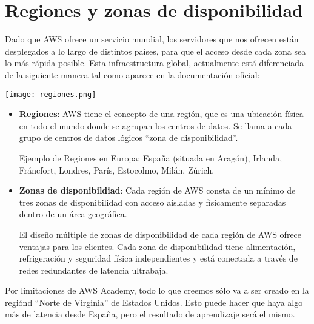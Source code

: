 \chapter{Regiones y zonas de disponibilidad}

Dado que AWS ofrece un servicio mundial, los servidores que nos ofrecen están desplegados a lo largo de distintos países, para que el acceso desde cada zona sea lo más rápida posible. Esta infraestructura global, actualmente está diferenciada de la siguiente manera tal como aparece en la \href{https://aws.amazon.com/es/about-aws/global-infrastructure/regions_az/?p=ngi&loc=2}{documentación oficial}:

\begin{center}
	\texttt{[image: regiones.png]}
\end{center}

\begin{itemize}
	\item \textbf{Regiones}: AWS tiene el concepto de una región, que es una ubicación física en todo el mundo donde se agrupan los centros de datos. Se llama a cada grupo de centros de datos lógicos “zona de disponibilidad”. 
	
	Ejemplo de Regiones en Europa: España (situada en Aragón), Irlanda, Fráncfort, Londres, París, Estocolmo, Milán, Zúrich.
	
	\item \textbf{Zonas de disponibildiad}: Cada región de AWS consta de un mínimo de tres zonas de disponibilidad con acceso aisladas y físicamente separadas dentro de un área geográfica. 
	
	El diseño múltiple de zonas de disponibilidad de cada región de AWS ofrece ventajas para los clientes. Cada zona de disponibilidad tiene alimentación, refrigeración y seguridad física independientes y está conectada a través de redes redundantes de latencia ultrabaja.
	
	
\end{itemize}


Por limitaciones de AWS Academy, todo lo que creemos sólo va a ser creado en la regiónd “Norte de Virginia” de Estados Unidos. Esto puede hacer que haya algo más de latencia desde España, pero el resultado de aprendizaje será el mismo.